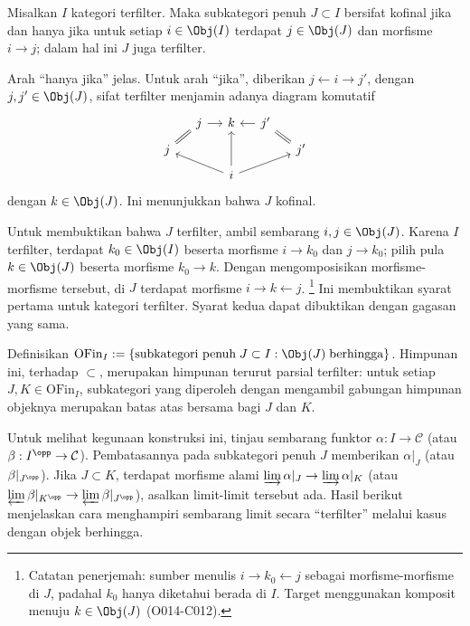 \begin{proposisi}\label{prop:cofinal-filtered}
	Misalkan $I$ kategori terfilter. Maka subkategori penuh $J\subset I$
	bersifat kofinal jika dan hanya jika untuk setiap $i \in \Obj(I)$ terdapat
	$j \in \Obj(J)$ dan morfisme $i \to j$; dalam hal ini $J$ juga terfilter.
\end{proposisi}
\begin{bukti}
	Arah ``hanya jika'' jelas. Untuk arah ``jika'', diberikan
	$j \leftarrow i \to j'$, dengan $j, j' \in \Obj(J)$, sifat terfilter
	menjamin adanya diagram komutatif
	\[\begin{tikzcd}[row sep=tiny, column sep=small]
		& j \arrow[r] & k & j' \arrow[l] & \\
		j \arrow[equal, ru] & & & & j' \arrow[equal, lu] \\
		& & i \arrow[llu] \arrow[uu] \arrow[rru] & &
	\end{tikzcd}\]
	dengan $k \in \Obj(J)$. Ini menunjukkan bahwa $J$ kofinal.

	Untuk membuktikan bahwa $J$ terfilter, ambil sembarang
	$i, j \in \Obj(J)$. Karena $I$
	terfilter, terdapat $k_0 \in \Obj(I)$ beserta morfisme $i\to k_0$ dan
	$j\to k_0$; pilih pula $k \in \Obj(J)$ beserta
	morfisme $k_0 \to k$. Dengan mengomposisikan morfisme-morfisme tersebut,
	di $J$ terdapat morfisme $i \rightarrow k \leftarrow j$.
	\footnote{Catatan penerjemah: sumber menulis
	$i\rightarrow k_0\leftarrow j$ sebagai morfisme-morfisme di $J$, padahal
	$k_0$ hanya diketahui berada di $I$. Target menggunakan komposit menuju
	$k\in\Obj(J)$ (O014-C012).} Ini membuktikan syarat pertama
	untuk kategori terfilter. Syarat kedua dapat dibuktikan dengan gagasan yang
	sama.
\end{bukti}

\begin{contoh}
	Definisikan
	$\mathrm{OFin}_I := \left\{ \text{subkategori penuh}\; J \subset I: \Obj(J) \;\text{berhingga} \right\}$.
	Himpunan ini, terhadap $\subset$, merupakan himpunan terurut parsial
	terfilter: untuk setiap $J, K \in \mathrm{OFin}_I$, subkategori yang
	diperoleh dengan mengambil gabungan himpunan objeknya merupakan batas atas
	bersama bagi $J$ dan $K$.
\end{contoh}

Untuk melihat kegunaan konstruksi ini, tinjau sembarang funktor
$\alpha: I \to \mathcal{C}$ (atau $\beta: I^{\opp} \to \mathcal{C}$).
Pembatasannya pada subkategori penuh $J$ memberikan $\alpha|_J$ (atau
$\beta|_{J^{\opp}}$). Jika $J \subset K$, terdapat morfisme alami
$\varinjlim \alpha|_J \to \varinjlim \alpha|_K$ (atau
$\varprojlim \beta|_{K^{\opp}} \to \varprojlim \beta|_{J^{\opp}}$), asalkan
limit-limit tersebut ada. Hasil berikut menjelaskan cara
menghampiri sembarang limit secara ``terfilter'' melalui kasus dengan
objek berhingga.

